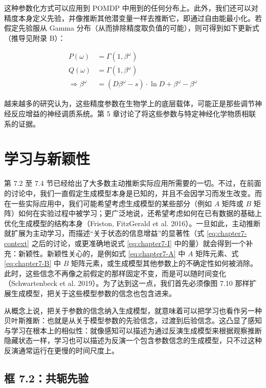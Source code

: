 这种参数化方式可以应用到 POMDP 中用到的任何分布上。此外，我们还可以对精度本身定义先验，并像推断其他潜变量一样去推断它，即通过自由能最小化。若假定先验服从 Gamma 分布（从而排除精度取负值的可能），则可得到如下更新式（推导见附录 B）：

\begin{equation}
\begin{aligned}
P(\omega) &= \Gamma(1,\beta^\omega) \\
Q(\omega) &= \Gamma(1,\beta^\omega) \\
\Rightarrow \beta^\omega &= (D\beta^\omega - s)\cdot \ln D + \beta^\omega - \beta^\omega
\end{aligned}
\end{equation}

越来越多的研究认为，这些精度参数在生物学上的底层载体，可能正是那些调节神经反应增益的神经调质系统。第 5 章讨论了将这些参数与特定神经化学物质相联系的证据。

\section{学习与新颖性}

第 7.2 至 7.4 节已经给出了大多数主动推断实际应用所需要的一切。不过，在前面的讨论中，我们一直假定生成模型本身是已知的，并且不会因学习而发生改变。而在一些实际应用中，我们可能希望考虑生成模型的某些部分（例如 $A$ 矩阵或 $B$ 矩阵）如何在实验过程中被学习；更广泛地说，还希望考虑如何在已有数据的基础上优化生成模型的结构本身（Friston, FitzGerald et al. 2016）。一旦如此，主动推断就扩展为主动学习，而描述“关于状态的信息增益”的显著性（式 \eqref{eq:chapter7-context} 之后的讨论，或更准确地说式 \eqref{eq:chapter7-I} 中的量）就会得到一个补充：新颖性。新颖性关心的，是例如式 \eqref{eq:chapter7-A} 中 $A$ 矩阵元素、式 \eqref{eq:chapter7-B} 中 $B$ 矩阵元素，或生成模型其他参数上的不确定性如何被消除。此时，这些信念不再像之前假定的那样固定不变，而是可以随时间变化（Schwartenbeck et al. 2019）。为了达到这一点，我们首先必须像图 7.10 那样扩展生成模型，把关于这些模型参数的信念也包含进来。

从概念上说，把关于参数的信念纳入生成模型，就意味着可以把学习也看作另一种贝叶斯推断：也就是从关于模型参数的先验信念，过渡到后验信念。这凸显了感知与学习在根本上的相似性：就像感知可以描述为通过反演生成模型来根据观察推断隐藏状态一样，学习也可以描述为反演一个包含参数信念的生成模型，只不过这种反演通常运行在更慢的时间尺度上。

\subsection*{框 7.2：共轭先验}

